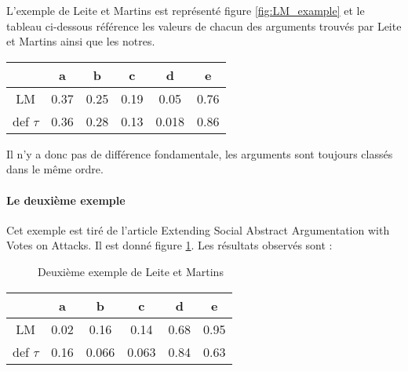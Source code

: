\documentclass[12pt]{article}
\theoremstyle{defi}
\theoremstyle{not}
\theoremstyle{prob}
\begin{document}
L'exemple de Leite et Martins est représenté figure \ref{fig:LM_example} et le tableau ci-dessous référence les valeurs de chacun des arguments trouvés par Leite et Martins ainsi que les notres.

\begin{tabular}{|c|c|c|c|c|c|}
  \hline
             & a    & b    & c    & d     & e \\
  \hline
  LM         & 0.37 & 0.25 & 0.19 & 0.05  & 0.76 \\
  \hline
  def $\tau$ & 0.36 & 0.28 & 0.13 & 0.018 & 0.86\\
  \hline
\end{tabular}

Il n'y a donc pas de différence fondamentale, les arguments sont toujours classés dans le même ordre.

\paragraph{Le deuxième exemple\\}
Cet exemple est tiré de l'article Extending Social Abstract Argumentation with Votes on Attacks. Il est donné figure \ref{fig:LM2_example}. Les résultats observés sont :

\begin{figure}
\centering
{}
\caption{Deuxième exemple de Leite et Martins}
\label{fig:LM2_example}
\end{figure}

\begin{tabular}{|c|c|c|c|c|c|}
  \hline
             & a    & b     & c     & d    & e \\
  \hline
  LM         & 0.02 & 0.16  & 0.14  & 0.68 & 0.95 \\
  \hline
  def $\tau$ & 0.16 & 0.066 & 0.063 & 0.84 & 0.63\\
  \hline
\end{tabular}
\end{document}
